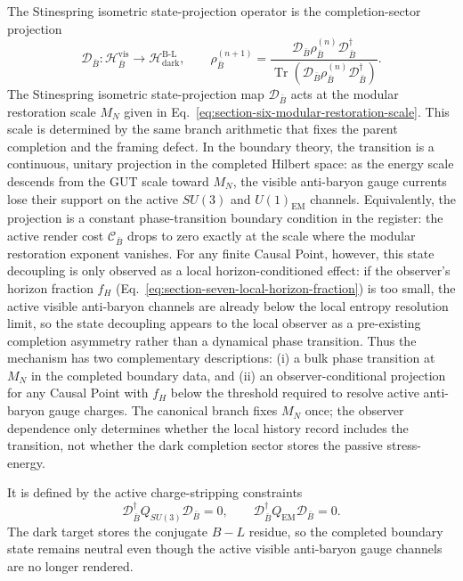 \documentclass[11pt,letterpaper]{article}
\theoremstyle{plain}
\DeclareMathOperator{\Tr}{Tr}
\begin{document}
The Stinespring isometric state-projection operator is the completion-sector projection
\begin{equation}
\label{eq:section-six-state-projection-operator}
 \mathcal D_{\bar B}:
 \mathcal H_{\bar B}^{\text{vis}}
 \longrightarrow
 \mathcal H_{\text{dark}}^{\text{B-L}},
 \qquad
 \rho_{\bar B}^{(n+1)}
 =
 \frac{
 \mathcal D_{\bar B}\rho_{\bar B}^{(n)}\mathcal D_{\bar B}^{\dagger}}
 {\Tr\!\left(
 \mathcal D_{\bar B}\rho_{\bar B}^{(n)}\mathcal D_{\bar B}^{\dagger}
 \right)}.
\end{equation}
The Stinespring isometric state-projection map $\mathcal D_{\bar B}$ acts at the modular restoration
scale $M_N$ given in
Eq.~\eqref{eq:section-six-modular-restoration-scale}.  This scale is
determined by the same branch arithmetic that fixes the parent completion and
the framing defect.  In the boundary theory, the transition is a continuous,
unitary projection in the completed Hilbert space: as the energy scale descends
from the GUT scale toward $M_N$, the visible anti-baryon gauge currents lose
their support on the active $SU(3)$ and $U(1)_{\text{EM}}$ channels.  Equivalently,
the projection is a constant phase-transition boundary condition in the
register: the active render cost $\mathcal C_{\bar B}$ drops to zero exactly at
the scale where the modular restoration exponent vanishes.  For any finite
Causal Point, however, this state decoupling is only observed as a local
horizon-conditioned effect: if the observer's horizon fraction $f_H$
(Eq.~\eqref{eq:section-seven-local-horizon-fraction}) is too small, the active
visible anti-baryon channels are already below the local entropy resolution
limit, so the state decoupling appears to the local observer as a pre-existing
completion asymmetry rather than a dynamical phase transition.  Thus the
mechanism has two complementary descriptions: (i) a bulk phase transition at
$M_N$ in the completed boundary data, and (ii) an observer-conditional
projection for any Causal Point with $f_H$ below the threshold required to
resolve active anti-baryon gauge charges.  The canonical branch fixes $M_N$
once; the observer dependence only determines whether the local history record
includes the transition, not whether the dark completion sector stores the
passive stress-energy.

It is defined by the active charge-stripping constraints
\begin{equation}
\label{eq:section-six-stripping-constraints}
 \boxed{
 \mathcal D_{\bar B}^{\dagger}Q_{SU(3)}\mathcal D_{\bar B}=0,
 \qquad
 \mathcal D_{\bar B}^{\dagger}Q_{\text{EM}}\mathcal D_{\bar B}=0.
 }
\end{equation}
The dark target stores the conjugate $B-L$ residue, so the completed boundary
state remains neutral even though the active visible anti-baryon gauge channels
are no longer rendered.
\end{document}
